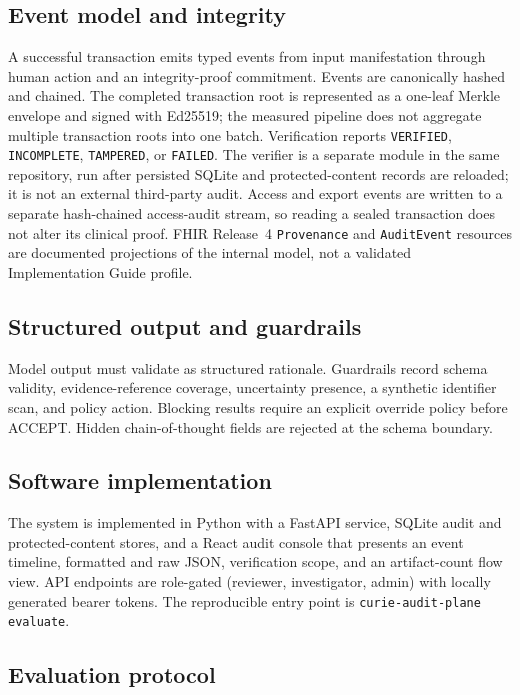 \documentclass[preprint,review,12pt]{elsarticle}
\begin{document}
\subsection{Event model and integrity}
\label{sec:events}

A successful transaction emits typed events from input manifestation through
human action and an integrity-proof commitment. Events are canonically hashed
and chained. The completed transaction root is represented as a one-leaf
Merkle envelope and signed with Ed25519; the measured pipeline does not
aggregate multiple transaction roots into one batch. Verification reports
\texttt{VERIFIED}, \texttt{INCOMPLETE}, \texttt{TAMPERED}, or \texttt{FAILED}.
The verifier is a separate module in the same repository, run after persisted
SQLite and protected-content records are reloaded; it is not an external
third-party audit. Access and export events are written to a separate
hash-chained access-audit stream, so reading a sealed transaction does not
alter its clinical proof. FHIR Release~4 \texttt{Provenance} and
\texttt{AuditEvent} resources are documented projections of the internal
model, not a validated Implementation Guide profile.

\subsection{Structured output and guardrails}
\label{sec:guardrails}

Model output must validate as structured rationale. Guardrails record schema
validity, evidence-reference coverage, uncertainty presence, a synthetic
identifier scan, and policy action. Blocking results require an explicit
override policy before ACCEPT. Hidden chain-of-thought fields are rejected at
the schema boundary.

\subsection{Software implementation}
\label{sec:software}

The system is implemented in Python with a FastAPI service, SQLite audit and
protected-content stores, and a React audit console that presents an event
timeline, formatted and raw JSON, verification scope, and an artifact-count
flow view. API endpoints are role-gated (reviewer, investigator, admin) with
locally generated bearer tokens. The reproducible entry point is
\texttt{curie-audit-plane evaluate}.

\subsection{Evaluation protocol}
\label{sec:eval}
\end{document}
